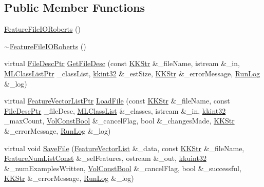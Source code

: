 \subsection*{Public Member Functions}
\begin{DoxyCompactItemize}
\item 
\hyperlink{class_k_k_m_l_l_1_1_feature_file_i_o_roberts_a811443cc6ca21661d3db4ab524ae6af8}{Feature\+File\+I\+O\+Roberts} ()
\item 
\hyperlink{class_k_k_m_l_l_1_1_feature_file_i_o_roberts_a761c4d022f4700f9ea3d60d12d68fd35}{$\sim$\+Feature\+File\+I\+O\+Roberts} ()
\item 
virtual \hyperlink{namespace_k_k_m_l_l_aa0d0b6ab4ec18868a399b8455b05d914}{File\+Desc\+Ptr} \hyperlink{class_k_k_m_l_l_1_1_feature_file_i_o_roberts_a76fea598ebe8feb2ca9df41a84c107e3}{Get\+File\+Desc} (const \hyperlink{class_k_k_b_1_1_k_k_str}{K\+K\+Str} \&\+\_\+file\+Name, istream \&\+\_\+in, \hyperlink{namespace_k_k_m_l_l_af091cde3f4a4315658b41a5e7583fc26}{M\+L\+Class\+List\+Ptr} \+\_\+class\+List, \hyperlink{namespace_k_k_b_a8fa4952cc84fda1de4bec1fbdd8d5b1b}{kkint32} \&\+\_\+est\+Size, \hyperlink{class_k_k_b_1_1_k_k_str}{K\+K\+Str} \&\+\_\+error\+Message, \hyperlink{class_k_k_b_1_1_run_log}{Run\+Log} \&\+\_\+log)
\item 
virtual \hyperlink{namespace_k_k_m_l_l_acf2ba92a3cf03e2b19674b24ff488ef6}{Feature\+Vector\+List\+Ptr} \hyperlink{class_k_k_m_l_l_1_1_feature_file_i_o_roberts_ad376d8df8ea16512703c02445aa12dc1}{Load\+File} (const \hyperlink{class_k_k_b_1_1_k_k_str}{K\+K\+Str} \&\+\_\+file\+Name, const \hyperlink{namespace_k_k_m_l_l_aa0d0b6ab4ec18868a399b8455b05d914}{File\+Desc\+Ptr} \+\_\+file\+Desc, \hyperlink{class_k_k_m_l_l_1_1_m_l_class_list}{M\+L\+Class\+List} \&\+\_\+classes, istream \&\+\_\+in, \hyperlink{namespace_k_k_b_a8fa4952cc84fda1de4bec1fbdd8d5b1b}{kkint32} \+\_\+max\+Count, \hyperlink{namespace_k_k_b_a7d390f568e2831fb76b86b56c87bf92f}{Vol\+Const\+Bool} \&\+\_\+cancel\+Flag, bool \&\+\_\+changes\+Made, \hyperlink{class_k_k_b_1_1_k_k_str}{K\+K\+Str} \&\+\_\+error\+Message, \hyperlink{class_k_k_b_1_1_run_log}{Run\+Log} \&\+\_\+log)
\item 
virtual void \hyperlink{class_k_k_m_l_l_1_1_feature_file_i_o_roberts_afebffe9dbe8bf74b236997e03ddaf8e2}{Save\+File} (\hyperlink{class_k_k_m_l_l_1_1_feature_vector_list}{Feature\+Vector\+List} \&\+\_\+data, const \hyperlink{class_k_k_b_1_1_k_k_str}{K\+K\+Str} \&\+\_\+file\+Name, \hyperlink{namespace_k_k_m_l_l_ad276a9ed309552a63300bce930bdfebd}{Feature\+Num\+List\+Const} \&\+\_\+sel\+Features, ostream \&\+\_\+out, \hyperlink{namespace_k_k_b_af8d832f05c54994a1cce25bd5743e19a}{kkuint32} \&\+\_\+num\+Examples\+Written, \hyperlink{namespace_k_k_b_a7d390f568e2831fb76b86b56c87bf92f}{Vol\+Const\+Bool} \&\+\_\+cancel\+Flag, bool \&\+\_\+successful, \hyperlink{class_k_k_b_1_1_k_k_str}{K\+K\+Str} \&\+\_\+error\+Message, \hyperlink{class_k_k_b_1_1_run_log}{Run\+Log} \&\+\_\+log)
\end{DoxyCompactItemize}
